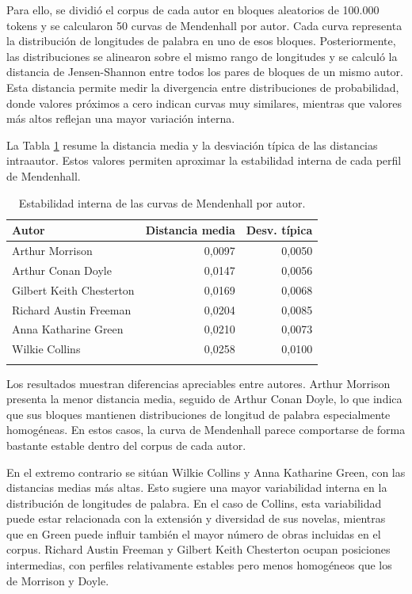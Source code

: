\documentclass[IB]{TFUOC}%
\begin{document}
Para ello, se dividió el corpus de cada autor en bloques aleatorios de 100.000 tokens y se calcularon 50 curvas de Mendenhall por autor. Cada curva representa la distribución de longitudes de palabra en uno de esos bloques. Posteriormente, las distribuciones se alinearon sobre el mismo rango de longitudes y se calculó la distancia de Jensen-Shannon entre todos los pares de bloques de un mismo autor. Esta distancia permite medir la divergencia entre distribuciones de probabilidad, donde valores próximos a cero indican curvas muy similares, mientras que valores más altos reflejan una mayor variación interna.

La Tabla \ref{tab:mendenhall-intraautor} resume la distancia media y la desviación típica de las distancias intraautor. Estos valores permiten aproximar la estabilidad interna de cada perfil de Mendenhall.

\begin{longtable}{|p{5cm}|r|r|}
\hline
\textbf{Autor} & \textbf{Distancia media} & \textbf{Desv. típica} \\
\hline
Arthur Morrison & 0,0097 & 0,0050 \\
\hline
Arthur Conan Doyle & 0,0147 & 0,0056 \\
\hline
Gilbert Keith Chesterton & 0,0169 & 0,0068 \\
\hline
Richard Austin Freeman & 0,0204 & 0,0085 \\
\hline
Anna Katharine Green & 0,0210 & 0,0073 \\
\hline
Wilkie Collins & 0,0258 & 0,0100 \\
\hline
\caption{Estabilidad interna de las curvas de Mendenhall por autor.}
\label{tab:mendenhall-intraautor}
\end{longtable}

Los resultados muestran diferencias apreciables entre autores. Arthur Morrison presenta la menor distancia media, seguido de Arthur Conan Doyle, lo que indica que sus bloques mantienen distribuciones de longitud de palabra especialmente homogéneas. En estos casos, la curva de Mendenhall parece comportarse de forma bastante estable dentro del corpus de cada autor.

En el extremo contrario se sitúan Wilkie Collins y Anna Katharine Green, con las distancias medias más altas. Esto sugiere una mayor variabilidad interna en la distribución de longitudes de palabra. En el caso de Collins, esta variabilidad puede estar relacionada con la extensión y diversidad de sus novelas, mientras que en Green puede influir también el mayor número de obras incluidas en el corpus. Richard Austin Freeman y Gilbert Keith Chesterton ocupan posiciones intermedias, con perfiles relativamente estables pero menos homogéneos que los de Morrison y Doyle.
\end{document}
